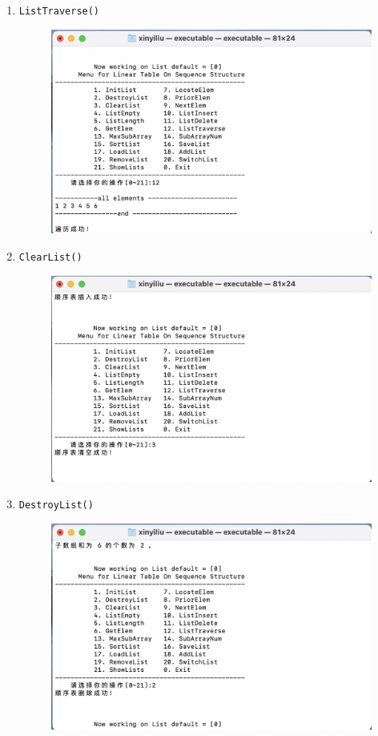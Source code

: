\documentclass[supercite]{Experimental_Report}
\theoremstyle{definition}
\begin{document}
\begin{enumerate}
\item \verb|ListTraverse()|
	\begin{figure}[!htb]
		\includegraphics[width=0.8\linewidth]{images/截屏2023-06-01 21.46.52.png}
	\end{figure}
	\FloatBarrier

\newpage

\item \verb|ClearList()|
	\begin{figure}[!htb]
		\includegraphics[width=0.8\linewidth]{images/截屏2023-06-01 21.56.17.png}
	\end{figure}
	\FloatBarrier

\item \verb|DestroyList()|
	\begin{figure}[!htb]
		\includegraphics[width=0.8\linewidth]{images/截屏2023-06-01 18.24.43.png}
	\end{figure}
	\FloatBarrier

\end{enumerate}
\newpage
\end{document}
